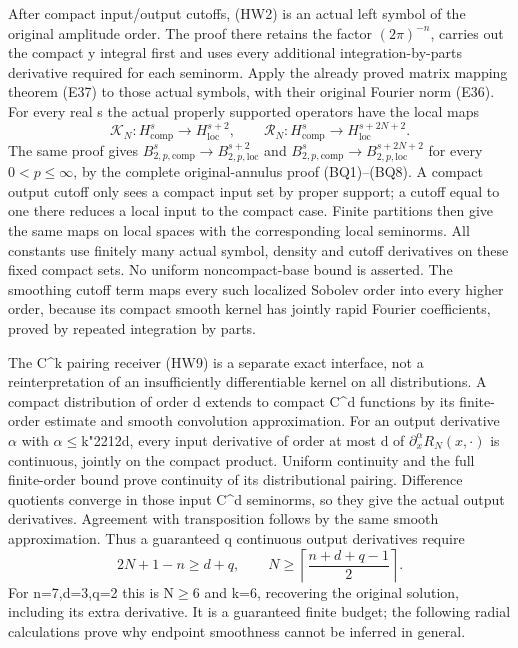 \documentclass[
  11pt,
]{article}
\begin{document}
After compact input/output cutoffs, (HW2) is an actual left symbol of
the original amplitude order. The proof there retains the factor
\((2\pi)^{-n}\), carries out the compact y integral first and uses every
additional integration-by-parts derivative required for each seminorm.
Apply the already proved matrix mapping theorem (E37) to those actual
symbols, with their original Fourier norm (E36). For every real s the
actual properly supported operators have the local maps \[
\mathcal K_N:H^s_{\mathrm{comp}}\longrightarrow H^{s+2}_{\mathrm{loc}},
\qquad
\mathcal R_N:H^s_{\mathrm{comp}}\longrightarrow
                         H^{s+2N+2}_{\mathrm{loc}}.
\tag{HD6}
\] The same proof gives
\(B^s_{2,p,\mathrm{comp}}\to B^{s+2}_{2,p,\mathrm{loc}}\) and
\(B^s_{2,p,\mathrm{comp}}\to B^{s+2N+2}_{2,p,\mathrm{loc}}\) for every
\(0<p\leq\infty\), by the complete original-annulus proof (BQ1)--(BQ8).
A compact output cutoff only sees a compact input set by proper support;
a cutoff equal to one there reduces a local input to the compact case.
Finite partitions then give the same maps on local spaces with the
corresponding local seminorms. All constants use finitely many actual
symbol, density and cutoff derivatives on these fixed compact sets. No
uniform noncompact-base bound is asserted. The smoothing cutoff term
maps every such localized Sobolev order into every higher order, because
its compact smooth kernel has jointly rapid Fourier coefficients, proved
by repeated integration by parts.

The C\^{}k pairing receiver (HW9) is a separate exact interface, not a
reinterpretation of an insufficiently differentiable kernel on all
distributions. A compact distribution of order d extends to compact
C\^{}d functions by its finite-order estimate and smooth convolution
approximation. For an output derivative \ensuremath{\alpha} with \textbar \ensuremath{\alpha}\textbar\ensuremath{\leq}k{\ReaderSymbols\char"2212}d,
every input derivative of order at most d of
\(\partial_x^\alpha R_N(x,\cdot)\) is continuous, jointly on the compact
product. Uniform continuity and the full finite-order bound prove
continuity of its distributional pairing. Difference quotients converge
in those input C\^{}d seminorms, so they give the actual output
derivatives. Agreement with transposition follows by the same smooth
approximation. Thus a guaranteed q continuous output derivatives require
\[
2N+1-n\geq d+q,
\qquad N\geq\left\lceil\frac{n+d+q-1}{2}\right\rceil.
\tag{HD7}
\] For n=7,d=3,q=2 this is N\ensuremath{\geq}6 and k=6, recovering the original
solution, including its extra derivative. It is a guaranteed finite
budget; the following radial calculations prove why endpoint smoothness
cannot be inferred in general.
\end{document}
